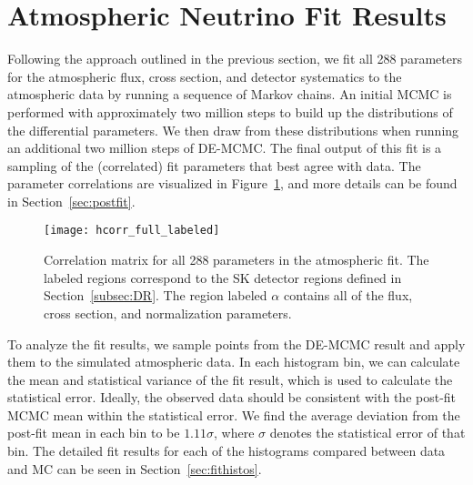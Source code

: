 

\section{Atmospheric Neutrino Fit Results}
\label{sec:fitresults}

Following the approach outlined in the previous section, we fit all 288
parameters for the atmospheric flux, cross section, and detector systematics to
the atmospheric data by running a sequence of Markov chains.  An initial MCMC is
performed with approximately two million steps to build up the distributions of
the differential parameters.  We then draw from these distributions when running
an additional two million steps of DE-MCMC\@.  The final output of this fit is 
a sampling of the (correlated) fit parameters that best agree with data. The parameter
correlations are visualized in Figure~\ref{fig:fitcorr}, and more details can
be found in Section~\ref{sec:postfit}.

\begin{figure}[h]
  \begin{center}
    \texttt{[image: hcorr\_full\_labeled]}
  \end{center}
  \caption{Correlation matrix for all 288 parameters in the atmospheric fit.
  The labeled regions correspond to the SK detector regions defined in
  Section~\ref{subsec:DR}.  The region labeled $\alpha$ contains all of the
  flux, cross section, and normalization parameters.}
  \label{fig:fitcorr}
\end{figure}

To analyze the fit results, we
sample points from the DE-MCMC result and apply them to the simulated
atmospheric data\@.  In each histogram bin, we can calculate the mean and
statistical variance of the fit result, which is used to calculate the
statistical error.  Ideally, the observed data should be consistent with the
post-fit MCMC mean within the statistical error.  We find the average deviation
from the post-fit mean in each bin to be $1.11\sigma$, where $\sigma$ denotes
the statistical error of that bin.  The detailed fit results for each of the
histograms compared between data and MC can be seen in Section~\ref{sec:fithistos}.



